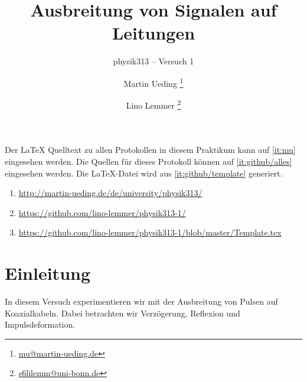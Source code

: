


\usepackage{placeins}



\subject{Praktikumsprotokoll}
\title{Ausbreitung von Signalen auf Leitungen}
\subtitle{physik313 – Versuch 1}
\author{
	Martin Ueding \footnote{\href{mailto:mu@martin-ueding.de}{mu@martin-ueding.de}}
	\and
	Lino Lemmer \footnote{\href{mailto:s6lilemm@uni-bonn.de}{s6lilemm@uni-bonn.de}}
}
\publishers{Gruppe 3 -- A -- Tutor: Christoph Brezina}




\maketitle

Der \LaTeX{} Quelltext zu allen Protokollen in diesem Praktikum kann auf
\ref{it:mu} eingesehen werden. Die Quellen für dieses Protokoll können auf
\ref{it:github/alles} eingesehen werden. Die \LaTeX-Datei wird aus
\ref{it:github/template} generiert.

\begin{enumerate}
	\item
		\label{it:mu}
		\url{http://martin-ueding.de/de/university/physik313/}
	\item
		\label{it:github/alles}
		\url{https://github.com/lino-lemmer/physik313-1/}
	\item
		\label{it:github/template}
		\url{https://github.com/lino-lemmer/physik313-1/blob/master/Template.tex}
\end{enumerate}

\newpage
\tableofcontents
\newpage


\section{Einleitung}

In diesem Versuch experimentieren wir mit der Ausbreitung von Pulsen auf
Koaxialkabeln. Dabei betrachten wir Verzögerung, Reflexion und
Impulsdeformation.

